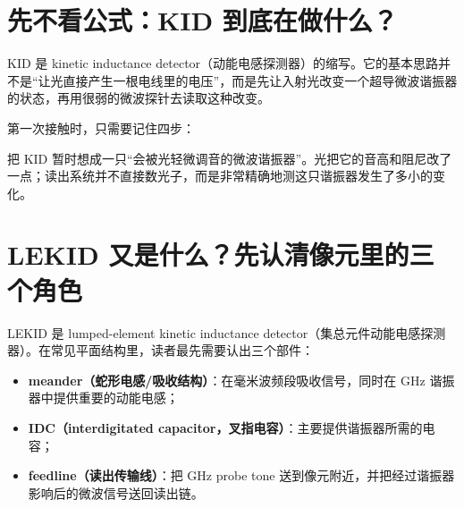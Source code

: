 \documentclass[11pt,a4paper,openany]{ctexrep}
\begin{document}
\section{先不看公式：KID 到底在做什么？}
KID 是 kinetic inductance detector（动能电感探测器）的缩写。它的基本思路并不是“让光直接产生一根电线里的电压”，而是先让入射光改变一个超导微波谐振器的状态，再用很弱的微波探针去读取这种改变。

第一次接触时，只需要记住四步：
\begin{center}
\end{center}

\begin{intuitionbox}
把 KID 暂时想成一只“会被光轻微调音的微波谐振器”。光把它的音高和阻尼改了一点；读出系统并不直接数光子，而是非常精确地测这只谐振器发生了多小的变化。
\end{intuitionbox}

\section{LEKID 又是什么？先认清像元里的三个角色}
LEKID 是 lumped-element kinetic inductance detector（集总元件动能电感探测器）。在常见平面结构里，读者最先需要认出三个部件：
\begin{itemize}
  \item \textbf{meander（蛇形电感/吸收结构）}：在毫米波频段吸收信号，同时在 GHz 谐振器中提供重要的动能电感；
  \item \textbf{IDC（interdigitated capacitor，叉指电容）}：主要提供谐振器所需的电容；
  \item \textbf{feedline（读出传输线）}：把 GHz probe tone 送到像元附近，并把经过谐振器影响后的微波信号送回读出链。
\end{itemize}
\end{document}
